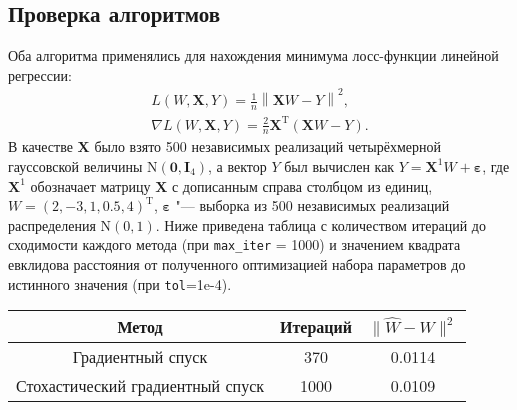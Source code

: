 \documentclass{article}
\begin{document}
\subsection{Проверка алгоритмов}\label{subsec:sgd-test}
Оба алгоритма применялись для нахождения минимума лосс-функции линейной регрессии:
\begin{gather}
  \label{eq:lin-loss}
  L(W, \mathbf{X}, Y) = \frac{1}{n} \left\|\mathbf{X}W - Y\right\|^2, \\
  \label{eq:lin-loss-grad}
  \nabla L(W, \mathbf{X}, Y) = \frac{2}{n} \mathbf{X}^{\mathrm{T}}(\mathbf{X}W - Y).
\end{gather}
В качестве $\mathbf{X}$ было взято 500 независимых реализаций четырёхмерной
гауссовской величины $\mathrm{N}(\boldsymbol{0}, \mathbf{I}_4)$,
а вектор $Y$ был вычислен как $Y = \mathbf{X}^{1}W + \boldsymbol{\varepsilon}$,
где $\mathbf{X}^{1}$ обозначает матрицу $\mathbf{X}$ с дописанным справа столбцом
из единиц, $W = (2, -3, 1, 0.5, 4)^{\mathrm{T}}$, $\boldsymbol{\varepsilon}$ "---
выборка из 500 независимых реализаций распределения $\mathrm{N}(0, 1)$.
Ниже приведена таблица с количеством итераций до сходимости каждого метода (при
\verb|max_iter| = 1000) и значением квадрата евклидова расстояния от
полученного оптимизацией набора параметров до истинного значения (при \verb|tol|=1e-4).
\begin{table}[!ht]
  \centering
  \begin{tabular}{|c|c|c|}
    \hline
    Метод & Итераций &  $\|\widehat{W} - W\|^2$ \\ \hline
    Градиентный спуск & 370 & 0.0114 \\ \hline
    Стохастический градиентный спуск & 1000 & 0.0109 \\ \hline
  \end{tabular}
\end{table}
\end{document}

